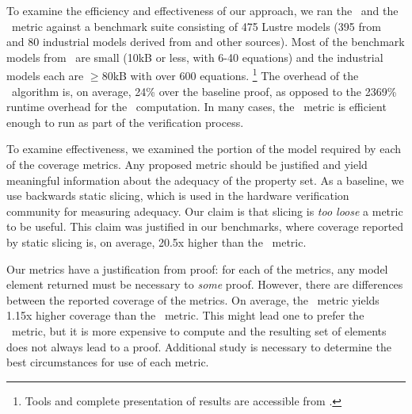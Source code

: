 
To examine the efficiency and effectiveness of our approach, we ran the \mustcov\ and the \ivccov\ metric against a benchmark suite consisting of 475 Lustre models (395 from~\cite{Hagen08:FMCAD} and 80 industrial models derived from \cite{hilt2013} and other sources).  Most of the benchmark models from~\cite{Hagen08:FMCAD} are small (10kB or less, with 6-40 equations) and the industrial models each are $\geq $80kB with over 600 equations. \footnote{Tools and complete presentation of results are accessible from \cite{anoexpr}.}
The overhead of the \ucalg\ algorithm is, on average, 24\% over the baseline proof, as opposed to the 2369\% runtime overhead for the \mustcov\ computation.  In many cases, the \ivccov\ metric is efficient enough to run as part of the verification process.

To examine effectiveness, we examined the portion of the model required by each of the coverage metrics.  Any proposed metric should be justified and yield meaningful information about the adequacy of the property set.  As a baseline, we use backwards static slicing, which is used in the hardware verification community for measuring adequacy.  Our claim is that slicing is {\em too loose} a metric to be useful.  This claim was justified in our benchmarks, where coverage reported by static slicing is, on average, 20.5x higher than the \ivccov\ metric.

Our metrics have a justification from proof: for each of the metrics, any model element returned must be necessary to {\em some} proof.  However, there are differences between the reported coverage of the metrics.  On average, the \ivccov\ metric yields 1.15x higher coverage than the \mustcov\ metric.  This might lead one to prefer the \mustcov\ metric, but it is more expensive to compute and the resulting set of elements does not always lead to a proof.  Additional study is necessary to determine the best circumstances for use of each metric.

